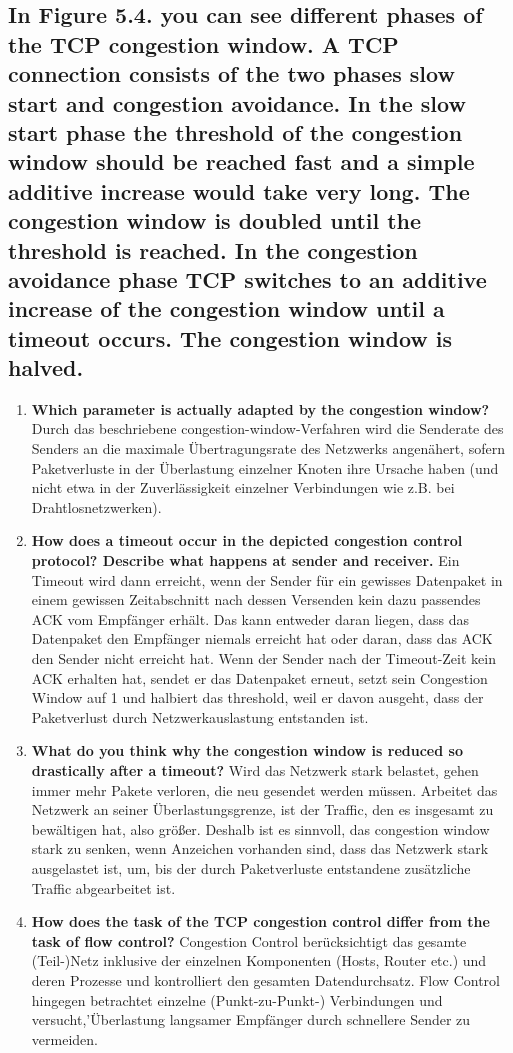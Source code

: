 \documentclass[a4paper,
			llpt,
			solution,
			accentcolor=tud2d,
			colorbacktitle
			]
			{tudexercise}
\begin{document}
\subsection{In Figure 5.4. you can see different phases of the TCP congestion window. A TCP connection consists of the two phases slow start and congestion avoidance. In the slow start phase the threshold of the congestion window should be reached fast and a simple additive increase would take very long. The congestion window is doubled until the threshold is reached. In the congestion avoidance phase TCP switches to an additive increase of the congestion window until a timeout occurs. The congestion window is halved.}
\begin{enumerate}
\item \textbf{Which parameter is actually adapted by the congestion window?} Durch das beschriebene congestion-window-Verfahren wird die Senderate des Senders an die maximale Übertragungsrate des Netzwerks angenähert, sofern Paketverluste in der Überlastung einzelner Knoten ihre Ursache haben (und nicht etwa in der Zuverlässigkeit einzelner Verbindungen wie z.B. bei Drahtlosnetzwerken).
\item \textbf{How does a timeout occur in the depicted congestion control protocol? Describe what
happens at sender and receiver.} Ein Timeout wird dann erreicht, wenn der Sender für ein gewisses Datenpaket in einem gewissen Zeitabschnitt nach dessen Versenden kein dazu passendes ACK vom Empfänger erhält. Das kann entweder daran liegen, dass das Datenpaket den Empfänger niemals erreicht hat oder daran, dass das ACK den Sender nicht erreicht hat. Wenn der Sender nach der Timeout-Zeit kein ACK erhalten hat, sendet er das Datenpaket erneut, setzt sein Congestion Window auf 1 und halbiert das threshold, weil er davon ausgeht, dass der Paketverlust durch Netzwerkauslastung entstanden ist.
\item \textbf{What do you think why the congestion window is reduced so drastically after a timeout?}
Wird das Netzwerk stark belastet, gehen immer mehr Pakete verloren, die neu gesendet werden müssen. Arbeitet das Netzwerk an seiner Überlastungsgrenze, ist der Traffic, den es insgesamt zu bewältigen hat, also größer. Deshalb ist es sinnvoll, das congestion window stark zu senken, wenn Anzeichen vorhanden sind, dass das Netzwerk stark ausgelastet ist, um, bis der durch Paketverluste entstandene zusätzliche Traffic abgearbeitet ist.
\item \textbf{How does the task of the TCP congestion control differ from the task of flow control?}
Congestion Control berücksichtigt das gesamte (Teil-)Netz inklusive der einzelnen Komponenten (Hosts, Router etc.) und deren Prozesse und kontrolliert den gesamten Datendurchsatz.  Flow Control hingegen betrachtet einzelne (Punkt-zu-Punkt-) Verbindungen und versucht,'Überlastung langsamer Empfänger durch schnellere Sender zu vermeiden.
\end{enumerate}
\clearpage
\end{document}
